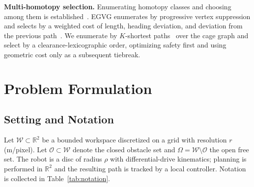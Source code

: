 \documentclass[conference]{IEEEtran}
\begin{document}
\textbf{Multi-homotopy selection.} Enumerating homotopy classes and choosing among them is established~\cite{bhattacharya2012,qi2025egvg}. EGVG enumerates by progressive vertex suppression and selects by a weighted cost of length, heading deviation, and deviation from the previous path~\cite{qi2025egvg}. We enumerate by $K$-shortest paths~\cite{yen1971} over the cage graph and select by a clearance-lexicographic order, optimizing safety first and using geometric cost only as a subsequent tiebreak.

\section{Problem Formulation}
\label{sec:problem}

\subsection{Setting and Notation}

Let $\mathcal{W}\subset\mathbb{R}^2$ be a bounded workspace discretized on a grid with resolution $r$ (m/pixel). Let $\mathcal{O}\subset\mathcal{W}$ denote the closed obstacle set and $\Omega=\mathcal{W}\setminus\mathcal{O}$ the open free set. The robot is a disc of radius $\rho$ with differential-drive kinematics; planning is performed in $\mathbb{R}^2$ and the resulting path is tracked by a local controller. Notation is collected in Table~\ref{tab:notation}.
\end{document}
